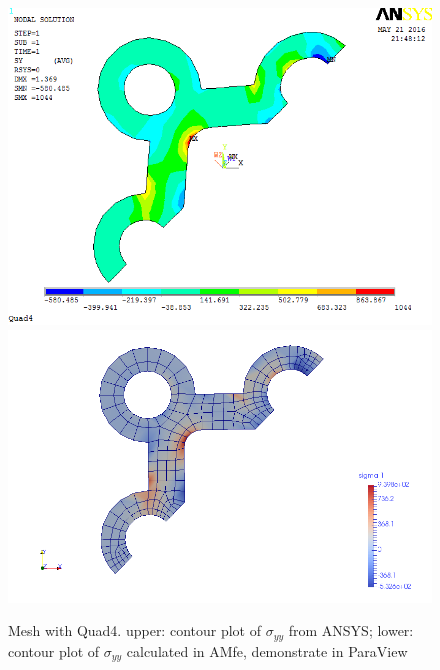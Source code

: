 \begin{figure}[htbp]
	\begin{center}
		\includegraphics[width=13cm,clip]{Quad4_Syy.png} 		
		\includegraphics[width=13cm,clip]{Quad4_Syy_P.png} 		
		\caption{Mesh with Quad4. upper: contour plot of $\sigma_{yy}$ from ANSYS; lower: contour plot of $\sigma_{yy}$ calculated in AMfe, demonstrate in ParaView} \label{fig: Quad4_Syy}
	\end{center}
\end{figure}

